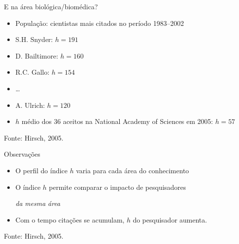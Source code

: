 \documentclass{beamer}
\begin{document}



\begin{frame}{E na área biológica/biomédica?}
  \begin{itemize}
    \footnotesize
  \item População: cientistas mais citados no período 1983--2002
  \item<1-> S.H. Snyder: $h=191$
  \item<1-> D. Bailtimore: $h=160$
  \item<1-> R.C. Gallo: $h=154$
  \item<1-> \ldots
  \item<1-> A. Ulrich: $h=120$
  \item<2-> $h$ médio dos 36 aceitos na National Academy of Sciences em 2005: $h=57$
  \end{itemize}

  \vfill
  \footnotesize
  \hfill Fonte: Hirsch, 2005.
\end{frame}

\begin{frame}{Observações}
  \begin{itemize}
    \footnotesize
  \item O perfil do índice $h$ varia para cada área do conhecimento
    \bigskip
  \item O índice $h$ permite comparar o impacto de pesquisadores

    {\em da mesma área}
    \bigskip
  \item Com o tempo citações se acumulam, $h$ do pesquisador aumenta.
  \end{itemize}

  \vfill
  \footnotesize
  \hfill Fonte: Hirsch, 2005.
\end{frame}

\end{document}
